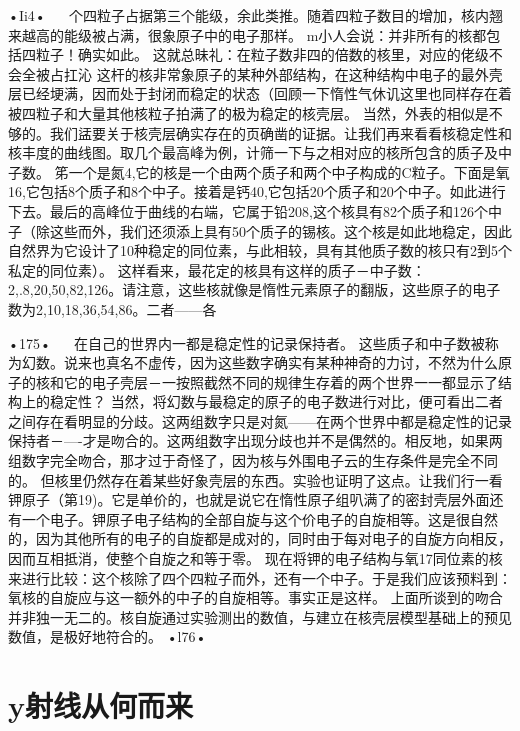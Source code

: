 •Ii4•
  
个四粒子占据第三个能级，余此类推。随着四粒子数目的增加，核内翘来越高的能级被占满，很象原子中的电子那样。
m小人会说：并非所有的核都包括四粒子！确实如此。
这就总昧礼：在粒子数非四的倍数的核里，对应的佬级不会全被占扛沁
这杆的核非常象原子的某种外部结构，在这种结构中电子的最外壳层已经埂满，因而处于封闭而稳定的状态（回顾一下惰性气休讥这里也同样存在着被四粒子和大量其他核粒子拍满了的极为稳定的核壳层。
当然，外表的相似是不够的。我们盓要关于核壳层确实存在的页确凿的证据。让我们再来看看核稳定性和核丰度的曲线图。取几个最高峰为例，计筛一下与之相对应的核所包含的质子及中子数。
笫一个是氮4,它的核是一个由两个质子和两个中子构成的C粒子。下面是氧16,它包括8个质子和8个中子。接着是钙40,它包括20个质子和20个中子。如此进行下去。最后的高峰位于曲线的右端，它属于铅208,这个核具有82个质子和126个中子（除这些而外，我们还须添上具有50个质子的锡核。这个核是如此地稳定，因此自然界为它设计了10种稳定的同位素，与此相较，具有其他质子数的核只有2到5个私定的同位素）。
这样看来，最花定的核具有这样的质子－中子数：2,.8,20,50,82,126。请注意，这些核就像是惰性元素原子的翻版，这些原子的电子数为2,10,18,36,54,86。二者——各

•175•
  
在自己的世界内一都是稳定性的记录保持者。
这些质子和中子数被称为幻数。说来也真名不虚传，因为这些数字确实有某种神奇的力讨，不然为什么原子的核和它的电子壳层－一按照截然不同的规律生存着的两个世界一一都显示了结构上的稳定性？
当然，将幻数与最稳定的原子的电子数进行对比，便可看出二者之间存在看明显的分歧。这两组数字只是对氮——在两个世界中都是稳定性的记录保持者－—-才是吻合的。这两组数字出现分歧也并不是偶然的。相反地，如果两组数字完全吻合，那才过于奇怪了，因为核与外围电子云的生存条件是完全不同的。
但核里仍然存在着某些好象壳层的东西。实验也证明了这点。让我们行一看钾原子（第19)。它是单价的，也就是说它在惰性原子组叭满了的密封壳层外面还有一个电子。钾原子电子结构的全部自旋与这个价电子的自旋相等。这是很自然的，因为其他所有的电子的自旋都是成对的，同时由于每对电子的自旋方向相反，因而互相抵消，使整个自旋之和等于零。
现在将钾的电子结构与氧17同位素的核来进行比较：这个核除了四个四粒子而外，还有一个中子。于是我们应该预料到：氧核的自旋应与这一额外的中子的自旋相等。事实正是这样。
上面所谈到的吻合并非独一无二的。核自旋通过实验测出的数值，与建立在核壳层模型基础上的预见数值，是极好地符合的。
•l76•
  
\section{y射线从何而来}

